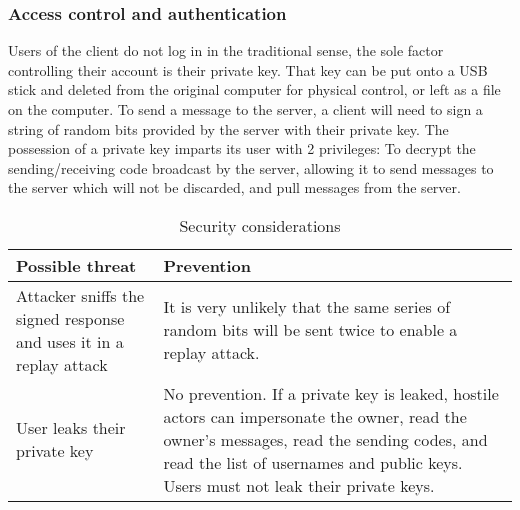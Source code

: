 \documentclass{article}
\begin{document}
\subsubsection{Access control and authentication}
Users of the client do not log in in the traditional sense, the sole factor controlling their account is their private key. That key can be put onto a USB stick and deleted from the original computer for physical control, or left as a file on the computer. To send a message to the server, a client will need to sign a string of random bits provided by the server with their private key. The possession of a private key imparts its user with 2 privileges: To decrypt the sending/receiving code broadcast by the server, allowing it to send messages to the server which will not be discarded, and pull messages from the server.
\begin{table}[H]
    \centering
    \caption{Security considerations}
    \vspace{0.2cm}
    \begin{tabular}{p{}p{}}
    \toprule
    \textbf{Possible threat} & \textbf{Prevention}\\
    \midrule
        Attacker sniffs the signed response and uses it in a replay attack & It is very unlikely that the same series of random bits will be sent twice to enable a replay attack.\\
    \midrule
    User leaks their private key & No prevention. If a private key is leaked, hostile actors can impersonate the owner, read the owner's messages, read the sending codes, and read the list of usernames and public keys. Users must not leak their private keys.\\
    \bottomrule
    \end{tabular}
    \label{tab:secconsauth}
\end{table}
\end{document}
